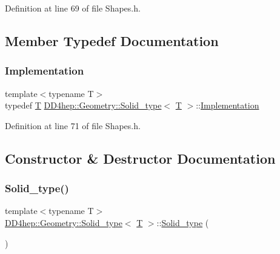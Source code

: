 Definition at line 69 of file Shapes.\+h.



\subsection{Member Typedef Documentation}
\hypertarget{class_d_d4hep_1_1_geometry_1_1_solid__type_a660e91d2703f947ad759fe0cbef3bbc6}{}\label{class_d_d4hep_1_1_geometry_1_1_solid__type_a660e91d2703f947ad759fe0cbef3bbc6} 
\subsubsection{\texorpdfstring{Implementation}{Implementation}}
{\footnotesize\ttfamily template$<$typename T$>$ \\
typedef \hyperlink{class_t}{T} \hyperlink{class_d_d4hep_1_1_geometry_1_1_solid__type}{D\+D4hep\+::\+Geometry\+::\+Solid\+\_\+type}$<$ \hyperlink{class_t}{T} $>$\+::\hyperlink{class_d_d4hep_1_1_handle_ad7ff728a25806079516b8965b9113f1a}{Implementation}\hspace{0.3cm}{\ttfamily [protected]}}



Definition at line 71 of file Shapes.\+h.



\subsection{Constructor \& Destructor Documentation}
\hypertarget{class_d_d4hep_1_1_geometry_1_1_solid__type_a6bbf7e29a4fff256be29a4d5455ec978}{}\label{class_d_d4hep_1_1_geometry_1_1_solid__type_a6bbf7e29a4fff256be29a4d5455ec978} 
\subsubsection{\texorpdfstring{Solid\+\_\+type()}{Solid\_type()}\hspace{0.1cm}{\footnotesize\ttfamily [1/5]}}
{\footnotesize\ttfamily template$<$typename T$>$ \\
\hyperlink{class_d_d4hep_1_1_geometry_1_1_solid__type}{D\+D4hep\+::\+Geometry\+::\+Solid\+\_\+type}$<$ \hyperlink{class_t}{T} $>$\+::\hyperlink{class_d_d4hep_1_1_geometry_1_1_solid__type}{Solid\+\_\+type} (\begin{DoxyParamCaption}{ }\end{DoxyParamCaption})\hspace{0.3cm}{\ttfamily [default]}}



